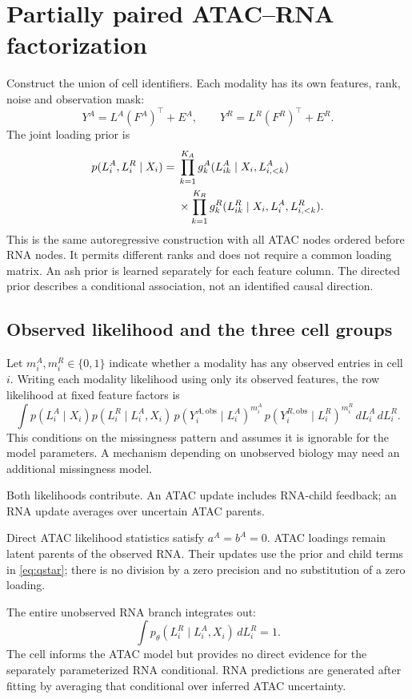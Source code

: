 \clearpage
\section{Partially paired ATAC--RNA factorization}
\label{sec:multiview}
Construct the union of cell identifiers. Each modality has its own features,
rank, noise and observation mask:
\[
Y^A=L^A(F^A)^\top+E^A,\qquad
Y^R=L^R(F^R)^\top+E^R.
\]
The joint loading prior is
\begin{align}
p(L_i^A,L_i^R\mid X_i)
={}&\prod_{k=1}^{K_A}g^A_k(L^A_{ik}\mid X_i,L^A_{i,<k})\notag\\
&\times\prod_{k=1}^{K_R}
g^R_k(L^R_{ik}\mid X_i,L_i^A,L^R_{i,<k}).
\label{eq:multiviewprior}
\end{align}
This is the same autoregressive construction with all ATAC nodes ordered
before RNA nodes. It permits different ranks and does not require a common
loading matrix. An ash prior is learned separately for each feature column.
The directed prior describes a conditional association, not an identified
causal direction.

\subsection{Observed likelihood and the three cell groups}
Let \(m_i^A,m_i^R\in\{0,1\}\) indicate whether a modality has any observed
entries in cell \(i\). Writing each modality likelihood using only its
observed features, the row likelihood at fixed feature factors is
\begin{equation}
\int p(L_i^A\mid X_i)p(L_i^R\mid L_i^A,X_i)
\,p(Y_i^{A,\mathrm{obs}}\mid L_i^A)^{m_i^A}
\,p(Y_i^{R,\mathrm{obs}}\mid L_i^R)^{m_i^R}
\,dL_i^A\,dL_i^R.
\label{eq:observedmultiview}
\end{equation}
This conditions on the missingness pattern and assumes it is ignorable for
the model parameters. A mechanism depending on unobserved biology may need
an additional missingness model.

\begin{description}[leftmargin=0pt]
\item[Paired cell.] Both likelihoods contribute. An ATAC update includes
RNA-child feedback; an RNA update averages over uncertain ATAC parents.
\item[RNA-only cell.] Direct ATAC likelihood statistics satisfy
\(a^A=b^A=0\). ATAC loadings remain latent parents of the observed RNA.
Their updates use the prior and child terms in \eqref{eq:qstar}; there is
no division by a zero precision and no substitution of a zero loading.
\item[ATAC-only cell.] The entire unobserved RNA branch integrates out:
\[
\int p_\theta(L_i^R\mid L_i^A,X_i)\,dL_i^R=1.
\]
The cell informs the ATAC model but provides no direct evidence for the
separately parameterized RNA conditional. RNA predictions are generated
after fitting by averaging that conditional over inferred ATAC uncertainty.
\end{description}

